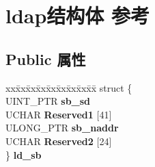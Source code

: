 \hypertarget{structldap}{}\section{ldap结构体 参考}
\label{structldap}
\subsection*{Public 属性}
\begin{DoxyCompactItemize}
\item 
\mbox{\label{structldap_a4f752c2b8dc4a9c02b48ae392ea98162}} 
\begin{tabbing}
xx\=xx\=xx\=xx\=xx\=xx\=xx\=xx\=xx\=\kill
struct \{\\
\>UINT\_PTR {\bfseries sb\_sd}\\
\>UCHAR {\bfseries Reserved1} \mbox{[}41\mbox{]}\\
\>ULONG\_PTR {\bfseries sb\_naddr}\\
\>UCHAR {\bfseries Reserved2} \mbox{[}24\mbox{]}\\
\} {\bfseries ld\_sb}\\


\end{tabbing}
\end{DoxyCompactItemize}
